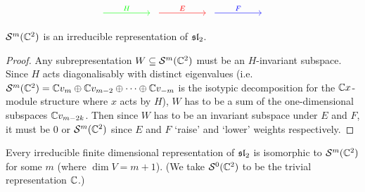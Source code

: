 \begin{equation*}
  \begin{tikzcd}[column sep=huge]
    { } \ar[r, color=green, "H"] & { } \ar[r, color=red, "E"] & { } \ar[r, color=blue, "F"] & { }
  \end{tikzcd}
\end{equation*}

\begin{thm}
  $\mathcal{S}^m(\mathbb{C}^2)$ is an irreducible representation of $\operatorname{\mathfrak{sl}}_2$.
\end{thm}

\begin{proof}
  Any subrepresentation $W \subseteq \mathcal{S}^m(\mathbb{C}^2)$ must be an $H$-invariant subspace.
  Since $H$ acts diagonalisably with distinct eigenvalues (i.e.\@ $\mathcal{S}^m(\mathbb{C}^2) = \mathbb{C} v_m \oplus \mathbb{C} v_{m-2} \oplus \cdots \oplus \mathbb{C} v_{-m}$ is the isotypic decomposition for the $\mathbb{C} x$-module structure where $x$ acts by $H$), $W$ has to be a sum of the one-dimensional subspaces $\mathbb{C} v_{m-2k}$.
  Then since $W$ has to be an invariant subspace under $E$ and $F$, it must be $0$ or $\mathcal{S}^m(\mathbb{C}^2)$ since $E$ and $F$ `raise' and `lower' weights respectively.
\end{proof}

\begin{thm}
  Every irreducible finite dimensional representation of $\operatorname{\mathfrak{sl}}_2$ is isomorphic to $\mathcal{S}^m(\mathbb{C}^2)$ for some $m$ (where $\dim V = m+1$).
  (We take $\mathcal{S}^0(\mathbb{C}^2)$ to be the trivial representation $\mathbb{C}$.)
\end{thm}


